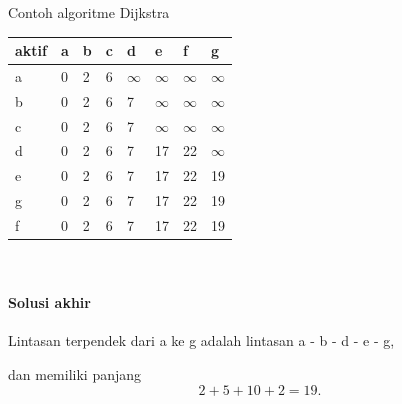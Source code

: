 \begin{example}{Contoh algoritme Dijkstra}
\begin{minipage}{0.49\textwidth}
\end{minipage}
\begin{minipage}{0.49\textwidth}
 \begin{tabular}{|l|l|l|l|l|l|l|l|}
    \hline
        aktif & a & b & c & d & e & f & g \\ \hline
        a & 0 & 2 & 6 & $\infty$ & $\infty$ & $\infty$& $\infty$  \\ \hline
        b & 0 & 2 & 6 & 7 & $\infty$ & $\infty$ & $\infty$ \\ \hline
        c & 0 & 2 & 6 & 7 & $\infty$ & $\infty$ & $\infty$  \\ \hline
        d & 0 & 2 & 6 & 7 & 17 & 22 & $\infty$ \\ \hline
        e & 0 & 2 & 6 & 7 & 17 & 22 & 19 \\ \hline
        g & 0 & 2 & 6 & 7 & 17 & 22 & 19  \\ \hline
        f & 0 & 2 & 6 & 7 & 17 & 22 & 19  \\ \hline
    \end{tabular}
\end{minipage}\\

\paragraph{Solusi akhir} 
Lintasan terpendek dari a ke g adalah lintasan a - b - d - e - g, 
\begin{center}
\par{}\label{fig:dijkstra-soln}%

\end{center} 
dan memiliki panjang 
$$
2 + 5 + 10 + 2 = 19.
$$
\end{example}

\newpage
\newpage

